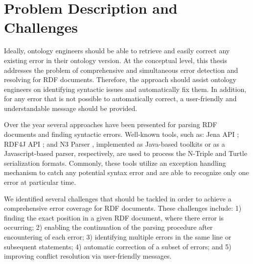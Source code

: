 \section{Problem Description and Challenges} 	
Ideally, ontology engineers should be able to retrieve and easily correct any existing error in their ontology version.
At the conceptual level, this thesis addresses the problem of comprehensive and simultaneous error detection and resolving for RDF documents.
Therefore, the approach should assist ontology engineers on identifying syntactic issues and automatically fix them.
In addition, for any error that is not possible to automatically correct, a user-friendly and understandable message should be provided.

Over the year several approaches have been presented for parsing RDF documents and finding syntactic errors.
Well-known tools, such as: Jena API \cite{McBride:2002:JSW:613357.613755}; RDF4J API \cite{RDF4J:Online}; and N3 Parser \cite{N3Parser:Online}, implemented as Java-based toolkits or as a Javascript-based parser, respectively, are used to process the N-Triple and Turtle serialization formats. 
Commonly, these tools utilize an exception handling mechanism to catch any potential syntax error and are able to recognize only one error at particular time.

We identified several challenges that should be tackled in order to achieve a comprehensive error coverage for RDF documents.
These challenges include: 1) finding the exact position in a given RDF document, where there error is occurring; 2) enabling the continuation of the parsing procedure after encountering of each error; 3) identifying multiple errors in the same line or subsequent statements; 4) automatic correction of a subset of errors; and 5) improving conflict resolution via user-friendly messages.


